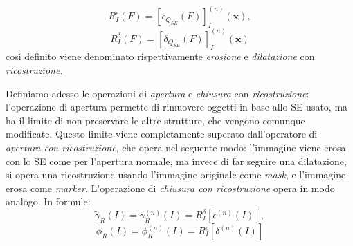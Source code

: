 \begin{equation}
	\label{eq:erosion-reconstruction}
	R^{\epsilon}_{I}(F)=[\epsilon_{Q_{SE}}(F)]^{(n)}_{I}(\textbf{x}),
\end{equation}
\begin{equation}
	\label{eq:dilation-reconstruction}
	R^{\delta}_{I}(F)=[\delta_{Q_{SE}}(F)]^{(n)}_{I}(\textbf{x})
\end{equation}
cos\`i definito viene denominato rispettivamente \textit{erosione} e \textit{dilatazione} con \textit{ricostruzione}.\par 
Definiamo adesso le operazioni di \textit{apertura} e \textit{chiusura} con \textit{ricostruzione}: l'operazione di apertura permette di rimuovere oggetti in base allo SE usato, ma ha il limite di non preservare le altre strutture, che vengono comunque modificate. Questo limite viene completamente superato dall'operatore di \textit{apertura con ricostruzione}, che opera nel seguente modo: l'immagine viene erosa con lo SE come per l'apertura normale, ma invece di far seguire una dilatazione, si opera una ricostruzione usando l'immagine originale come \textit{mask}, e l'immagine erosa come \textit{marker}. L'operazione di \textit{chiusura con ricostruzione} opera in modo analogo. In formule:
\begin{equation}
	\label{eq:opening-reconstruction}
	\tilde{\gamma}_{R}(I) = \gamma_{R}^{(n)}(I) = R_{I}^{\delta}[\epsilon^{(n)}(I)],
\end{equation}
\begin{equation}
	\label{eq:closing-reconstruction}
	\tilde{\phi}_{R}(I) = \phi_{R}^{(n)}(I) = R_{I}^{\epsilon}[\delta^{(n)}(I)]
\end{equation}

